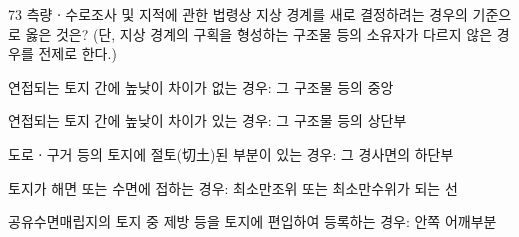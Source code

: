 \begin{question}{73}
측량ㆍ수로조사 및 지적에 관한 법령상 지상 경계를 새로 결정하려는 경우의 기준으로 옳은 것은? (단, 지상 경계의 구획을 형성하는 구조물 등의 소유자가 다르지 않은 경우를 전제로 한다.)
\begin{choices}
  \item 연접되는 토지 간에 높낮이 차이가 없는 경우: 그 구조물 등의 중앙
  \item 연접되는 토지 간에 높낮이 차이가 있는 경우: 그 구조물 등의 상단부
  \item 도로ㆍ구거 등의 토지에 절토(切土)된 부분이 있는 경우: 그 경사면의 하단부
  \item 토지가 해면 또는 수면에 접하는 경우: 최소만조위 또는 최소만수위가 되는 선
  \item 공유수면매립지의 토지 중 제방 등을 토지에 편입하여 등록하는 경우: 안쪽 어깨부분
\end{choices}
\end{question}
